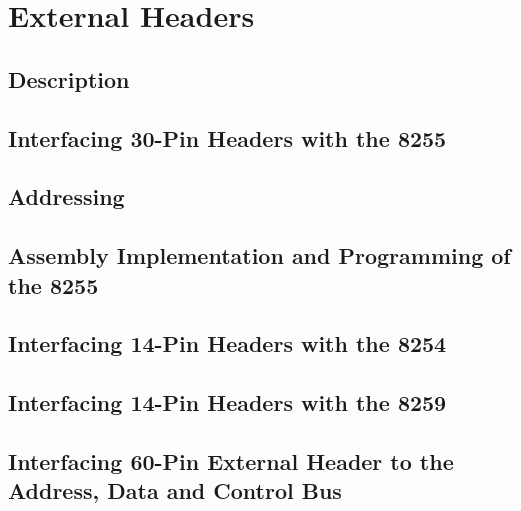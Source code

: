 \newpage
\section{External Headers}

    \subsection{Description}

    \subsection{Interfacing 30-Pin Headers with the 8255}

    \subsection{Addressing}

    \subsection{Assembly Implementation and Programming of the 8255}

    \subsection{Interfacing 14-Pin Headers with the 8254}

    \subsection{Interfacing 14-Pin Headers with the 8259}

    \subsection{Interfacing 60-Pin External Header to the Address, Data and Control Bus}
